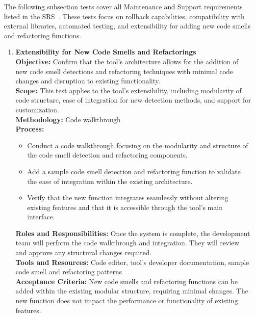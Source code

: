\documentclass[12pt, titlepage]{article}
\begin{document}
\medskip

\noindent
The following subsection tests cover all Maintenance and Support requirements listed in the SRS~\cite{SRS}. These tests focus on rollback capabilities, compatibility with external libraries, automated testing, and extensibility for adding new code smells and refactoring functions.

\begin{enumerate}[label={\bf \textcolor{Maroon}{test-MS-\arabic*}}, wide=0pt, font=\itshape]
  \item \textbf{Extensibility for New Code Smells and Refactorings} \\[2mm]
    \textbf{Objective:} Confirm that the tool’s architecture allows for the addition of new code smell detections and refactoring techniques with minimal code changes and disruption to existing functionality. \\[2mm]
    \textbf{Scope:} This test applies to the tool’s extensibility, including modularity of code structure, ease of integration for new detection methods, and support for customization. \\[2mm]
    \textbf{Methodology:} Code walkthrough \\[2mm]
    \textbf{Process:}
    \begin{itemize}
      \item Conduct a code walkthrough focusing on the modularity and structure of the code smell detection and refactoring components.
      \item Add a sample code smell detection and refactoring function to validate the ease of integration within the existing architecture.
      \item Verify that the new function integrates seamlessly without altering existing features and that it is accessible through the tool’s main interface.
    \end{itemize}
    \textbf{Roles and Responsibilities:} Once the system is complete, the development team will perform the code walkthrough and integration. They will review and approve any structural changes required. \\[2mm]
    \textbf{Tools and Resources:} Code editor, tool’s developer documentation, sample code smell and refactoring patterns \\[2mm]
    \textbf{Acceptance Criteria:} New code smells and refactoring functions can be added within the existing modular structure, requiring minimal changes. The new function does not impact the performance or functionality of existing features.



\end{enumerate}
\end{document}
